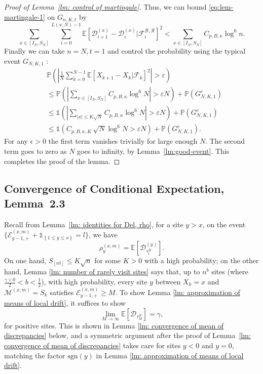 \documentclass[EJP]{ejpecp} %
\begin{document}
\begin{proof}[Proof of Lemma~\ref{lm: control of martingale}]
	Thus, we can bound \eqref{eq:lem-martingale-1} on $G_{n, K, t}$ by
	\begin{equation*}
		\sum_{x \in \left[ I_N, S_N \right]} \sum_{i = 0}^{L(x,N) - 1} \mathbb{E}\left[ \mathscr{D}_{i+1}^{(x)} - \mathscr{D}_i^{(x)} | \mathcal{F}_{i}^{\mathscr{B}, \mathscr{R}} \right]^2 
		< \sum_{x \in \left[ I_N, S_N \right]} C_{p, B, \kappa} \log^6 n.
	\end{equation*}
	Finally we can take $n = N, t = 1$ and control the probability using the typical event $G_{N, K, 1}$ :
	\begin{align*}
		&\mathbb{P}\left( \left| \frac{1}{N} \sum_{k = 0}^{N-1} \mathbb{E}\left[ X_{k+1} - X_k | \mathcal{F}_k \right]^2  \right|  > \varepsilon \right)\\
		&\le \mathbb{P}\left( \left| \sum_{x \in \left[ I_N, S_N \right]} C_{p, B, \kappa} \log^6 N  \right| > \varepsilon  N \right) + \mathbb{P}\left( G_{N, K, 1}^c \right)  \\
		&\le \mathbb{1}\left(  \left| \sum_{|x| \le K \sqrt{N} } C_{p, B, \kappa} \log^6 N \right| > \varepsilon  N  \right) + \mathbb{P}\left( G_{N, K, 1}^c \right)  \\
		&\le \mathbb{1}\left(  C_{p, B, \kappa, K} \, \sqrt{N} \log^6 N > \varepsilon  N  \right) + \mathbb{P}\left( G_{N, K, 1}^c \right) 
		.\end{align*}
	For any $\epsilon > 0$ the first term vanishes trivially for large enough $N$. The second term goes to zero as $N$ goes to infinity, by Lemma~\ref{lm:good-event}. This completes the proof of the lemma.
\end{proof}



\subsection{Convergence of Conditional Expectation, Lemma~2.3}
\label{sec:RhoGamma}
Recall from Lemma~\ref{lm: identities for Del, rho}, for a site $y> x$, 
on the event $\{\mathcal{E}^{(x,m)}_{y-1,+} +\mathbb{1}_{\left\{1\leq y\leq x\right\}} = l\}$, we have
\[
\rho^{(x,m)}_y = \mathbb{E}\left[\mathscr{D}_{\tau_l^{\mathscr{B}}}^{(y)}\right]
.\]
On one hand, $S_{\left\lfloor n t\right\rfloor} \leq K\sqrt{n} $ for some $K>0$ with a high probability; on the other hand, Lemma \ref{lm: number of rarely visit sites} says that, up to $n^b$ sites (where $\frac{\gamma \vee 0}{2}<b<\frac{1}{2}$), with high probability, every site $y$ between $X_k=x$ and $\mathcal{M}^{(x,m)} =S_{k}$ satisfies $ \mathcal{E}^{(x,m)}_{y-1,+} \geq M $. To show Lemma \ref{lm: approximation of means of local drift}, it suffices to show 
\begin{equation}\label{eq: convergence of conditional expectation}
	\lim_{M\to\infty} \mathbb{E}[\mathscr{D}_{\tau_M^{\mathscr{B}}}] = \gamma , 
\end{equation} 
for positive sites. This is shown in Lemma \ref{lm: convergence of mean of discrepancies} below, and a symmetric argument after the proof of Lemma~\ref{lm: convergence of mean of discrepancies} takes care for sites $y<0$ and $y=0$, matching the factor $\text{sgn}(y)$ in Lemma \ref{lm: approximation of means of local drift}.
\end{document}
